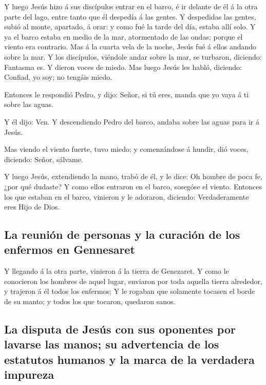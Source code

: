 Y luego Jesús hizo á sus discípulos entrar en el barco, é
ir delante de él á la otra parte del lago, entre tanto que él despedía á
las gentes.  Y despedidas las gentes, subió al monte,
apartado, á orar: y como fué la tarde del día, estaba allí solo.
 Y ya el barco estaba en medio de la mar, atormentado de
las ondas; porque el viento era contrario.  Mas á la cuarta
vela de la noche, Jesús fué á ellos andando sobre la mar. 
Y los discípulos, viéndole andar sobre la mar, se turbaron, diciendo:
Fantasma es. Y dieron voces de miedo.  Mas luego Jesús les
habló, diciendo: Confiad, yo soy; no tengáis miedo.

 Entonces le respondió Pedro, y dijo: Señor, si tú eres,
manda que yo vaya á ti sobre las aguas.

 Y él dijo: Ven. Y descendiendo Pedro del barco, andaba
sobre las aguas para ir á Jesús.

 Mas viendo el viento fuerte, tuvo miedo; y comenzándose á
hundir, dió voces, diciendo: Señor, sálvame.

 Y luego Jesús, extendiendo la mano, trabó de él, y le
dice: Oh hombre de poca fe, ¿por qué dudaste?  Y como ellos
entraron en el barco, sosegóse el viento.  Entonces los que
estaban en el barco, vinieron y le adoraron, diciendo: Verdaderamente
eres Hijo de Dios.

\hypertarget{la-reuniuxf3n-de-personas-y-la-curaciuxf3n-de-los-enfermos-en-gennesaret}{%
\subsection{La reunión de personas y la curación de los enfermos en
Gennesaret}\label{la-reuniuxf3n-de-personas-y-la-curaciuxf3n-de-los-enfermos-en-gennesaret}}

 Y llegando á la otra parte, vinieron á la tierra de
Genezaret.  Y como le conocieron los hombres de aquel
lugar, enviaron por toda aquella tierra alrededor, y trajeron á él todos
los enfermos;  Y le rogaban que solamente tocasen el borde
de su manto; y todos los que tocaron, quedaron sanos.

\hypertarget{la-disputa-de-jesuxfas-con-sus-oponentes-por-lavarse-las-manos-su-advertencia-de-los-estatutos-humanos-y-la-marca-de-la-verdadera-impureza}{%
\subsection{La disputa de Jesús con sus oponentes por lavarse las manos;
su advertencia de los estatutos humanos y la marca de la verdadera
impureza}\label{la-disputa-de-jesuxfas-con-sus-oponentes-por-lavarse-las-manos-su-advertencia-de-los-estatutos-humanos-y-la-marca-de-la-verdadera-impureza}}

